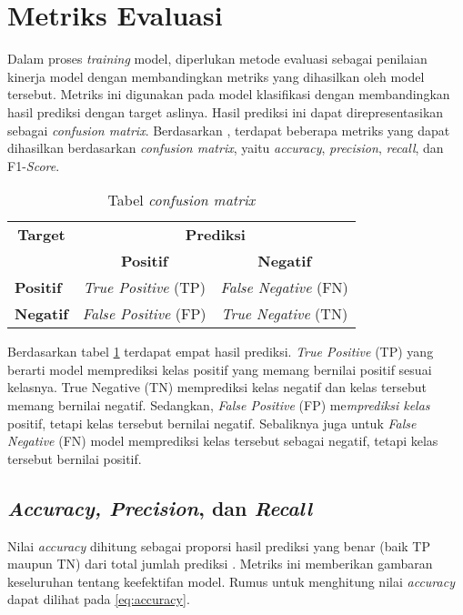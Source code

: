 \section{Metriks Evaluasi}

Dalam proses \textit{training} model, diperlukan metode evaluasi sebagai penilaian kinerja model dengan membandingkan metriks yang dihasilkan oleh model tersebut. Metriks ini digunakan pada model klasifikasi dengan membandingkan hasil prediksi dengan target aslinya. Hasil prediksi ini dapat direpresentasikan sebagai \textit{confusion matrix}. Berdasarkan \citeauthor{metrics}, terdapat beberapa metriks yang dapat dihasilkan berdasarkan \textit{confusion matrix}, yaitu \textit{accuracy}, \textit{precision}, \textit{recall}, dan F1-\textit{Score}.

\begin{table}[ht]
    \vspace{0.25cm}
    \centering
    \caption{Tabel \textit{confusion matrix} \parencite{metrics}}
    \label{table:confusion-matrix}
    \begin{tabular}{l|c|c}
        \toprule
        \multicolumn{1}{c|}{\textbf{Target}} & \multicolumn{2}{c}{\textbf{Prediksi}} \\
        & \textbf{Positif} & \textbf{Negatif} \\
        \midrule
        \textbf{Positif} & \textit{True Positive} (TP) & \textit{False Negative} (FN) \\
        \textbf{Negatif} & \textit{False Positive} (FP) & \textit{True Negative} (TN) \\
        \bottomrule
    \end{tabular}
\end{table}

Berdasarkan tabel \ref{table:confusion-matrix} terdapat empat hasil prediksi. \textit{True Positive} (TP) yang berarti model memprediksi kelas positif yang memang bernilai positif sesuai kelasnya. True Negative (TN) memprediksi kelas negatif dan kelas tersebut memang bernilai negatif. Sedangkan, \textit{False Positive} (FP) me\textit{mprediksi kelas} positif, tetapi kelas tersebut bernilai negatif. Sebaliknya juga untuk \textit{False Negative} (FN) model memprediksi kelas tersebut sebagai negatif, tetapi kelas tersebut bernilai positif.

\subsection{\textit{Accuracy, Precision}, dan \textit{Recall}}
Nilai \textit{accuracy} dihitung sebagai proporsi hasil prediksi yang benar (baik TP maupun TN) dari total jumlah prediksi \parencite{metrics}. Metriks ini memberikan gambaran keseluruhan tentang keefektifan model. Rumus untuk menghitung nilai \textit{accuracy} dapat dilihat pada \ref{eq:accuracy}.

